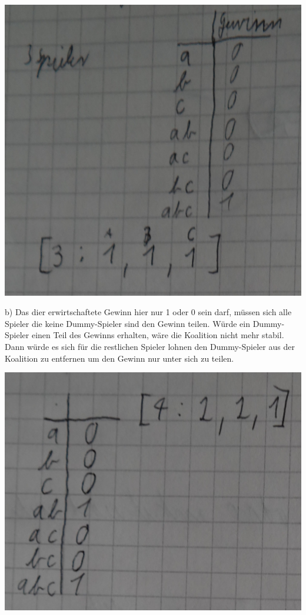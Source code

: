 \documentclass[a4paper, 11pt]{article}
\begin{document}
\begin{center}
\includegraphics[scale=0.5]{aufgabeA}\\
\end{center}

b) Das dier erwirtschaftete Gewinn hier nur 1 oder 0 sein darf, müssen sich alle
        Spieler die keine Dummy-Spieler sind den Gewinn teilen. Würde ein
        Dummy-Spieler einen Teil des Gewinns erhalten, wäre die Koalition nicht mehr
        stabil. Dann würde es sich für die restlichen Spieler lohnen den Dummy-Spieler
        aus der Koalition zu entfernen um den Gewinn nur unter sich zu teilen.

\begin{center}
\includegraphics[scale=0.5]{aufgabeB}\\
\end{center}
\end{document}
